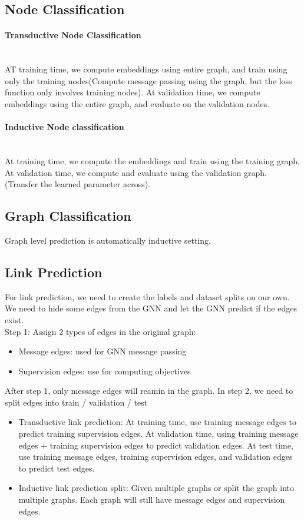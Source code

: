 \subsection{Node Classification} 
\paragraph{Transductive Node Classification} \mbox{}\\
AT training time, we compute embeddings using entire graph, and train using only the training nodes(Compute message passing using the graph, but the loss function only involves training nodes).  At validation time, we compute embeddings using the entire graph, and evaluate on the validation nodes. 

\paragraph{Inductive Node classification} \mbox{}\\
 At training time, we compute the embeddings and train using the training graph. At validation time, we compute and evaluate using the validation graph. (Transfer the learned parameter across). 
 
\subsection{Graph Classification} 
Graph level prediction is automatically inductive setting. 

\subsection{Link Prediction} 
For link prediction, we need to create the labels and dataset splits on our own. We need to hide some edges from the GNN and let the GNN predict if the edges exist. \\
Step 1: Assign 2 types of edges in the original graph: 
    \begin{itemize}
        \item Message edges: used for GNN message passing 
        \item Supervision edges: use for computing objectives 
    \end{itemize}
After step 1, only message edges will reamin in the graph. In step 2, we need to split edges into train / validation / test 
    \begin{itemize}
        \item Transductive link prediction: At training time, use training message edges to predict training supervision edges. At validation time, using training message edges + training supervision edges to predict validation edges. At test time, use training message edges, training supervision edges, and validation edges to predict test edges. 
        \item Inductive link prediction split: Given multiple graphs or split the graph into multiple graphs. Each graph will still have message edges and supervision edges. 
    \end{itemize}

